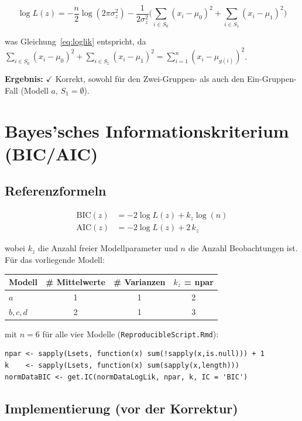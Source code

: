 \documentclass[11pt,a4paper]{article}
\begin{document}
\begin{equation}
\log L(z) = -\frac{n}{2}\log(2\pi\sigma_z^2)
   -\frac{1}{2\sigma_z^2}\Big(\sum_{i\in S_0}(x_i-\mu_0)^2 + \sum_{i\in S_1}(x_i-\mu_1)^2\Big)
\end{equation}

was Gleichung~\eqref{eq:loglik} entspricht, da
$\sum_{i\in S_0}(x_i-\mu_0)^2 + \sum_{i\in S_1}(x_i-\mu_1)^2 = \sum_{i=1}^n (x_i-\mu_{g(i)})^2$.

\textbf{Ergebnis:} $\checkmark$ Korrekt, sowohl für den Zwei-Gruppen- als auch
den Ein-Gruppen-Fall (Modell $a$, $S_1=\emptyset$).

\section{Bayes'sches Informationskriterium (BIC/AIC)}
\label{sec:bic}

\subsection{Referenzformeln}

\begin{align}
\text{BIC}(z) &= -2\log L(z) + k_z \log(n) \label{eq:bic}\\
\text{AIC}(z) &= -2\log L(z) + 2\,k_z \label{eq:aic}
\end{align}

wobei $k_z$ die Anzahl freier Modellparameter und $n$ die Anzahl
Beobachtungen ist. Für das vorliegende Modell:

\begin{center}
\begin{tabular}{lccc}
\toprule
Modell & \# Mittelwerte & \# Varianzen & $k_z$ = npar \\
\midrule
$a$ & 1 & 1 & 2 \\
$b,c,d$ & 2 & 1 & 3 \\
\bottomrule
\end{tabular}
\end{center}

mit $n=6$ für alle vier Modelle (\texttt{ReproducibleScript.Rmd}):
\begin{lstlisting}
npar <- sapply(Lsets, function(x) sum(!sapply(x,is.null))) + 1
k    <- sapply(Lsets, function(x) sum(sapply(x,length)))
normDataBIC <- get.IC(normDataLogLik, npar, k, IC = 'BIC')
\end{lstlisting}

\subsection{Implementierung (vor der Korrektur)}
\end{document}
